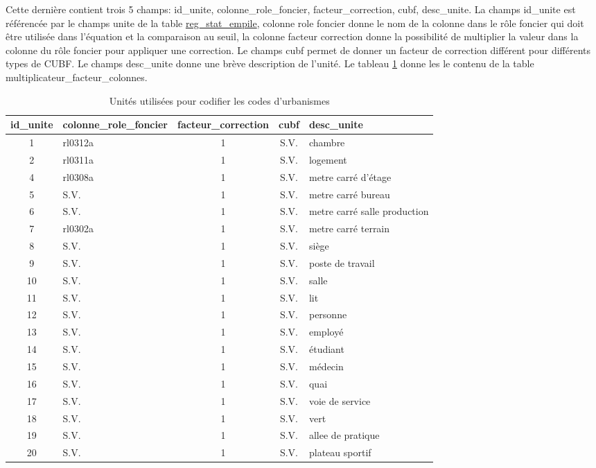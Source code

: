     Cette dernière contient trois 5 champs: id\_unite, colonne\_role\_foncier, facteur\_correction, cubf, desc\_unite. La champs id\_unite est référencée par le champs unite de la table \underline{reg\_stat\_empile}, colonne role foncier donne le nom de la colonne dans le rôle foncier qui doit être utilisée dans l'équation et la comparaison au seuil, la colonne facteur correction donne la possibilité de multiplier la valeur dans la colonne du rôle foncier pour appliquer une correction. Le champs cubf permet de donner un facteur de correction différent pour différents types de \ac{CUBF}. Le champs desc\_unite donne une brève description de l'unité. Le tableau \ref{tab:unite_pertinentes_minimum_stat} donne les le contenu de la table multiplicateur\_facteur\_colonnes.\par
    \begin{table}[h]
    \centering
        \begin{tabular}{c l c c p{3cm}}
            \hline
            id\_unite & colonne\_role\_foncier & facteur\_correction & cubf & desc\_unite \\ \hline
            1 & rl0312a & 1 & S.V. & chambre\\
            2 & rl0311a & 1 & S.V. & logement \\
            4 & rl0308a & 1 & S.V. & metre carré d'étage\\
            5 & S.V. & 1 & S.V. & metre carré bureau\\
            6 & S.V. & 1 & S.V. & metre carré salle production \\
            7 & rl0302a & 1 & S.V. & metre carré terrain\\
            8 & S.V. & 1 & S.V. & siège \\
            9 & S.V. & 1 & S.V. & poste de travail \\
            10 &S.V. & 1 & S.V. & salle \\
            11 & S.V. & 1 & S.V. & lit \\
            12 & S.V. & 1 & S.V. & personne \\
            13 & S.V. & 1 & S.V. & employé \\
            14 & S.V. & 1 & S.V. & étudiant \\
            15 & S.V. & 1 & S.V. & médecin \\
            16 & S.V. & 1 & S.V. & quai \\
            17 & S.V. & 1 & S.V. & voie de service \\
            18 & S.V. & 1 & S.V. & vert \\
            19 & S.V. & 1 & S.V. & allee de pratique \\
            20 & S.V. & 1 & S.V. & plateau sportif \\ \hline
        \end{tabular}
        \caption{Unités utilisées pour codifier les codes d'urbanismes}\label{tab:unite_pertinentes_minimum_stat}
    \end{table}
